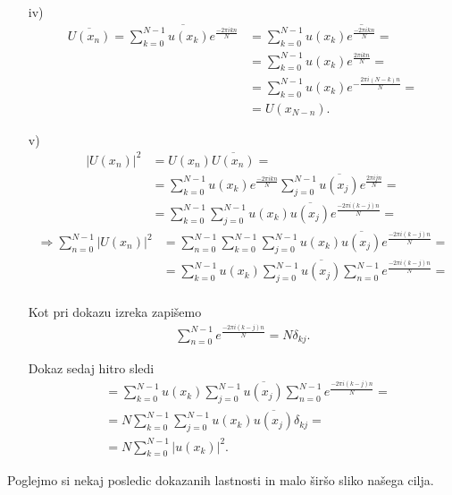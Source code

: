 \documentclass[mat2, tisk]{fmfdelo}
\begin{document}
\begin{dokaz}
\begin{enumerate}
\item[iv)]
\begin{align*}
  \overline{U(x_n)} = \overline{\sum_{k=0}^{N-1} u(x_k) e^{\frac{-2\pi i k n}{N}}} &= 
  \sum_{k=0}^{N-1} u(x_k) \overline{e^{\frac{-2\pi i k n}{N}}}=\\
  &= \sum_{k=0}^{N-1} u(x_k) e^{\frac{2\pi i k n}{N}}=  \\
  &= \sum_{k=0}^{N-1} u(x_k) e^{-\frac{2\pi i (N-k) n}{N}}= \\
  &= U(x_{N-n}).
\end{align*}
\item[v)] 
\begin{align*}
|U(x_n)|^2 &= U(x_n) \overline{U(x_n)} = \\
&= \sum_{k=0}^{N-1} u(x_k) e^{\frac{-2\pi i k n}{N}} \sum_{j=0}^{N-1} \overline{u(x_j)} e^{\frac{2\pi i j n}{N}} = \\
&= \sum_{k=0}^{N-1} \sum_{j=0}^{N-1} u(x_k) \overline{u(x_j)} e^{\frac{-2\pi i (k-j) n}{N}} = 
\end{align*}
\begin{align*}
\Longrightarrow \sum_{n=0}^{N-1} |U(x_n)|^2 &= \sum_{n=0}^{N-1} \sum_{k=0}^{N-1} \sum_{j=0}^{N-1} u(x_k) \overline{u(x_j)} e^{\frac{-2\pi i (k-j) n}{N}} = \\
&= \sum_{k=0}^{N-1}u(x_k) \sum_{j=0}^{N-1} \overline{u(x_j)} \sum_{n=0}^{N-1} e^{\frac{-2\pi i (k-j) n}{N}} = \\
\end{align*}

Kot pri dokazu izreka  zapišemo 
\begin{align*}
\sum_{n=0}^{N-1} e^{\frac{-2\pi i (k-j) n}{N}} = N \delta_{kj}.
\end{align*}

Dokaz sedaj hitro sledi 
\begin{align*}
&= \sum_{k=0}^{N-1}u(x_k) \sum_{j=0}^{N-1} \overline{u(x_j)} \sum_{n=0}^{N-1} e^{\frac{-2\pi i (k-j) n}{N}} = \\
&= N\sum_{k=0}^{N-1} \sum_{j=0}^{N-1} u(x_k)\overline{u(x_j)} \delta_{kj} = \\
&= N\sum_{k=0}^{N-1} |u(x_k)|^2.
\end{align*}
\end{enumerate}
\end{dokaz}

Poglejmo si nekaj posledic dokazanih lastnosti in malo 
širšo sliko našega cilja. \\
\end{document}
